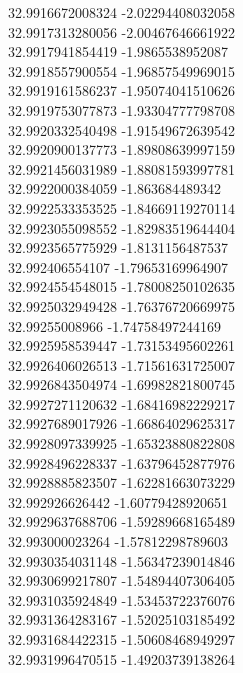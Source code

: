 {32.9916672008324	-2.02294408032058\\
32.9917313280056	-2.00467646661922\\
32.9917941854419	-1.9865538952087\\
32.9918557900554	-1.96857549969015\\
32.9919161586237	-1.95074041510626\\
32.9919753077873	-1.93304777798708\\
32.9920332540498	-1.91549672639542\\
32.9920900137773	-1.89808639997159\\
32.9921456031989	-1.88081593997781\\
32.9922000384059	-1.863684489342\\
32.9922533353525	-1.84669119270114\\
32.9923055098552	-1.82983519644404\\
32.9923565775929	-1.8131156487537\\
32.992406554107	-1.79653169964907\\
32.9924554548015	-1.78008250102635\\
32.9925032949428	-1.76376720669975\\
32.99255008966	-1.74758497244169\\
32.9925958539447	-1.73153495602261\\
32.9926406026513	-1.71561631725007\\
32.9926843504974	-1.69982821800745\\
32.9927271120632	-1.68416982229217\\
32.9927689017926	-1.66864029625317\\
32.9928097339925	-1.65323880822808\\
32.9928496228337	-1.63796452877976\\
32.9928885823507	-1.62281663073229\\
32.992926626442	-1.60779428920651\\
32.9929637688706	-1.59289668165489\\
32.993000023264	-1.57812298789603\\
32.9930354031148	-1.56347239014846\\
32.9930699217807	-1.54894407306405\\
32.9931035924849	-1.53453722376076\\
32.9931364283167	-1.52025103185492\\
32.9931684422315	-1.50608468949297\\
32.9931996470515	-1.49203739138264\\
}
